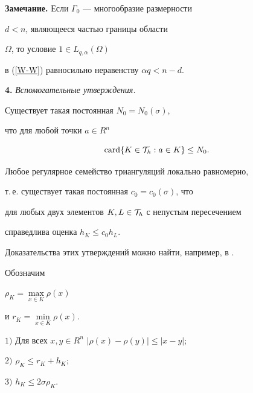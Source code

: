 {\bf Замечание.} Если $\Gamma_0$ --- многообразие размерности 


$d < n$, являющееся частью границы области 


$\Omega$, то условие $1 \in L_{q,\alpha}(\Omega)$ 


в (\ref{W-W}) равносильно неравенству $\alpha q < n-d$. 


\medskip





{\bf 4.} {\it Вспомогательные утверждения.} 





\begin{lem} \label{card}


Существует такая постоянная $N_0=N_0(\sigma)$, 


что для любой точки $a \in R^n$ 


$$


\card \{K \in {\cal T}_h:a \in K\} \le N_0.


$$


\end{lem}





\begin{lem} \label{loc.unif.}


Любое регулярное семейство триангуляций локально равномерно, 


т.\,е. существует такая постоянная $c_0=c_0(\sigma)$, что 


для любых двух элементов $K,L \in {\cal T}_h$ с непустым пересечением 


справедлива оценка $h_K \le c_0 h_L$.


\end{lem}





Доказательства этих утверждений можно найти, например, в \cite{Izvuz-92}. 





Обозначим 


$\rho_K=\max \limits_{x \in K} \rho(x)$


и $r_K=\min \limits_{x \in K} \rho(x)$.





\begin{lem} \label{r_K} 


$1)$ Для всех $x,y \in R^n$\; $|\rho(x)-\rho(y)| \le |x-y|;$ 


$2)$ $\rho_K \le r_K + h_K;$


$3)$ $h_K \le 2\sigma \rho_K$.


\end{lem}





